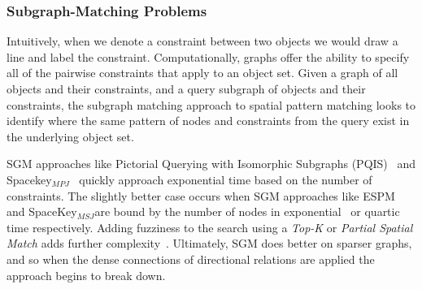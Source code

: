 \subsubsection{Subgraph-Matching Problems}
\par{
    Intuitively, when we denote a constraint between two objects we would draw a line and label the constraint. 
    Computationally, graphs offer the ability to specify all of the pairwise constraints that apply to an object set. 
    Given a graph of all objects and their constraints, and a query subgraph of objects and their constraints, the subgraph matching approach to spatial pattern matching looks to identify where the same pattern of nodes and constraints from the query exist in the underlying object set. 
    
    SGM approaches like Pictorial Querying with Isomorphic Subgraphs (PQIS)~\cite{Folkers2000} and Spacekey$_{MPJ}$~\cite{Fang2019} quickly approach exponential time based on the number of constraints. 
    The slightly better case occurs when SGM approaches like ESPM and SpaceKey$_{MSJ}$are bound by the number of nodes in exponential~\cite{Chen2019} or quartic~\cite{Fang2019} time respectively. 
    Adding fuzziness to the search using a \textit{Top-K} or \textit{Partial Spatial Match} adds further complexity~\cite{Fang2019}.
    Ultimately, SGM does better on sparser graphs, and so when the dense connections of directional relations are applied the approach begins to break down. 
}
